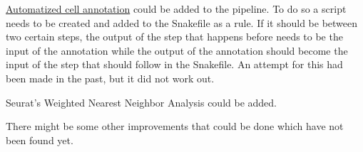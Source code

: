 \underline{Automatized cell annotation} could be added to the pipeline. To do so a script needs to be created and added to the Snakefile as a rule. If it should be between two certain steps, the output of the step that happens before needs to be the input of the annotation while the output of the annotation should become the input of the step that should follow in the Snakefile. An attempt for this had been made in the past, but it did not work out.

Seurat's Weighted Nearest Neighbor Analysis could be added.

There might be some other improvements that could be done which have not been found yet.
